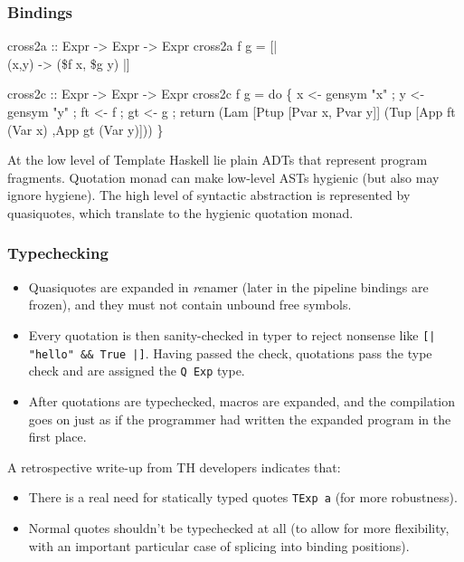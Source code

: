 \documentclass[hyperref={bookmarks=false}]{beamer}
\begin{document}
\begin{frame}[fragile]
\frametitle{Bindings}

\begin{lstlistinglike}
\begin{semiverbatim}
cross2a :: Expr -> Expr -> Expr
cross2a f g = [| \\(x,y) -> (\$f x, \$g y) |]

cross2c :: Expr -> Expr -> Expr
cross2c f g =
  do \{ x <- gensym "x"
     ; y <- gensym "y"
     ; ft <- f
     ; gt <- g
     ; return (Lam [Ptup [Pvar x, Pvar y]]
                   (Tup  [App ft (Var x)
                         ,App gt (Var y)]))
     \}
\end{semiverbatim}
\end{lstlistinglike}

At the low level of Template Haskell lie plain ADTs that represent program fragments.
Quotation monad can make low-level ASTs hygienic (but also may ignore hygiene).
The high level of syntactic abstraction is represented by quasiquotes, which translate to
the hygienic quotation monad.
\end{frame}

\begin{frame}[fragile]
\frametitle{Typechecking}

\begin{itemize}
\item Quasiquotes are expanded in \emph{re}namer (later in the pipeline bindings are frozen),
and they must not contain unbound free symbols.
\item Every quotation is then sanity-checked in typer to reject nonsense like \texttt{[| "hello" \&\& True |]}.
Having passed the check, quotations pass the type check and are assigned the \texttt{Q Exp} type.
\item After quotations are typechecked, macros are expanded, and the compilation goes on just
as if the programmer had written the expanded program in the first place.
\end{itemize}

A retrospective write-up from TH developers indicates that:
\begin{itemize}
\item There is a real need for statically typed quotes \texttt{TExp a} (for more robustness).
\item Normal quotes shouldn't be typechecked at all (to allow for more flexibility, with an important
particular case of splicing into binding positions).
\end{itemize}
\end{frame}
\end{document}
